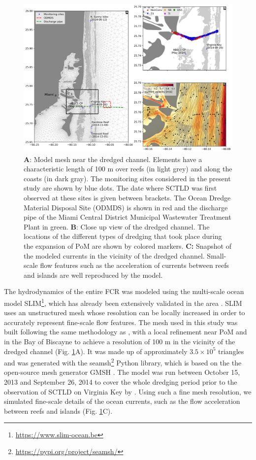 \begin{figure}
	\centering
	\includegraphics[width=\textwidth]{chapters/onset/figures/fig_mesh_onset.png}
	\caption{\textbf{A}: Model mesh near the dredged channel. Elements have a characteristic length of 100 m over reefs (in light grey) and along the coasts (in dark gray). The monitoring sites considered in the present study are shown by blue dots. The date where SCTLD was first observed at these sites is given between brackets. The Ocean Dredge Material Disposal Site (ODMDS) is shown in red and the discharge pipe of the Miami Central District Municipal Wastewater Treatment Plant in green. \textbf{B}: Close up view of the dredged channel. The locations of the different types of dredging that took place during the expansion of PoM are shown by colored markers. \textbf{C:} Snapshot of the modeled currents in the vicinity of the dredged channel. Small-scale flow features such as the acceleration of currents between reefs and islands are well reproduced by the model.}
	\label{fig:onset_mesh}
\end{figure}

The hydrodynamics of the entire FCR was modeled using the multi-scale ocean model SLIM\footnote{\url{ https://www.slim-ocean.be}}, which has already been extensively validated in the area \citep{frys2020fine,dobbelaere2020coupled,dobbelaere2022connecting}. SLIM uses an unstructured mesh whose resolution can be locally increased in order to accurately represent fine-scale flow features. The mesh used in this study was built following the same methodology as \cite{dobbelaere2020coupled}, with a local refinement near PoM and in the Bay of Biscayne to achieve a resolution of 100 m in the vicinity of the dredged channel (Fig. \ref{fig:onset_mesh}A). It was made up of approximately $3.5\times 10^5$ triangles and was generated with the seamsh\footnote{\url{https://pypi.org/project/seamsh/}} Python library, which is based on the the open-source mesh generator GMSH \citep{geuzaine2009gmsh}. The model was run between October 15, 2013 and September 26, 2014 to cover the whole dredging period prior to the observation of SCTLD on Virginia Key by \cite{precht2016unprecedented}. Using such a fine mesh resolution, we simulated fine-scale details of the ocean currents, such as the flow acceleration between reefs and islands (Fig. \ref{fig:onset_mesh}C).

